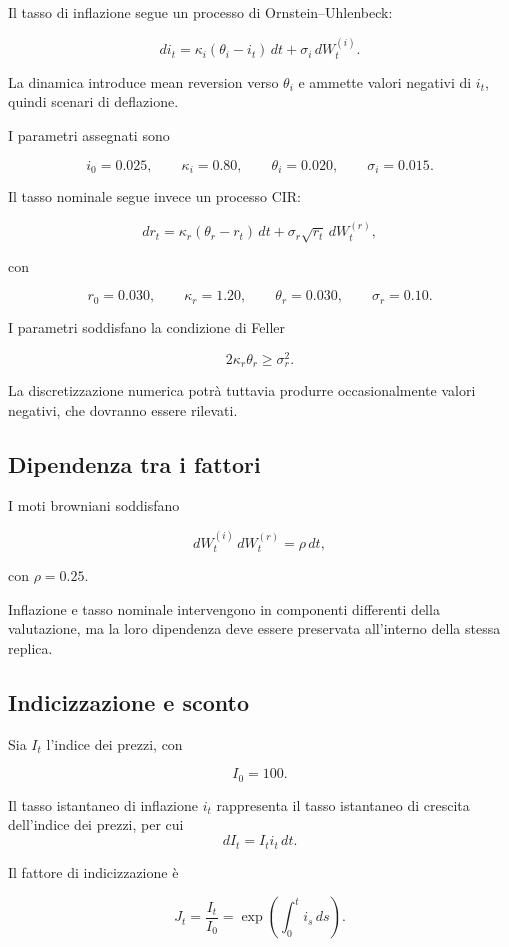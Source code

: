 Il tasso di inflazione segue un processo di Ornstein--Uhlenbeck:

\[
di_t
=
\kappa_i(\theta_i-i_t)\,dt
+
\sigma_i\,dW_t^{(i)}.
\]

La dinamica introduce mean reversion verso \(\theta_i\) e ammette valori
negativi di \(i_t\), quindi scenari di deflazione.

I parametri assegnati sono

\[
i_0=0.025,
\qquad
\kappa_i=0.80,
\qquad
\theta_i=0.020,
\qquad
\sigma_i=0.015.
\]

Il tasso nominale segue invece un processo CIR:

\[
dr_t
=
\kappa_r(\theta_r-r_t)\,dt
+
\sigma_r\sqrt{r_t}\,dW_t^{(r)},
\]

\noindent con

\[
r_0=0.030,
\qquad
\kappa_r=1.20,
\qquad
\theta_r=0.030,
\qquad
\sigma_r=0.10.
\]

I parametri soddisfano la condizione di Feller

\[
2\kappa_r\theta_r
\geq
\sigma_r^2.
\]

La discretizzazione numerica potr\`a tuttavia produrre occasionalmente valori
negativi, che dovranno essere rilevati.

\subsection{Dipendenza tra i fattori}

I moti browniani soddisfano

\[
dW_t^{(i)}\,dW_t^{(r)}
=
\rho\,dt,
\]

\noindent con $\rho=0.25$.

Inflazione e tasso nominale intervengono in componenti differenti della
valutazione, ma la loro dipendenza deve essere preservata all'interno della stessa replica.

\subsection{Indicizzazione e sconto}

Sia \(I_t\) l'indice dei prezzi, con

\[
I_0=100.
\]

Il tasso istantaneo di inflazione \(i_t\) rappresenta il tasso istantaneo di crescita dell'indice dei prezzi, per cui
\[
dI_t=I_t i_t\,dt.
\]

Il fattore di indicizzazione \`e

\[
J_t
=
\frac{I_t}{I_0}
=
\exp\left(
\int_0^t i_s\,ds
\right).
\]


